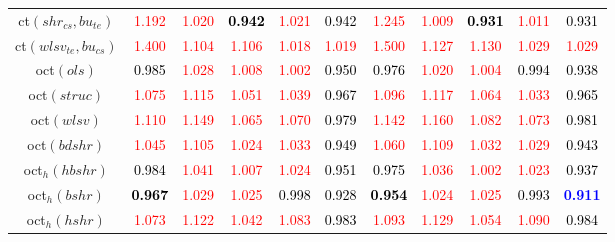 \begin{tabular}[t]{c|>{}cccc>{}c|ccccc}
ct$(shr_{cs}, bu_{te})$ & \textcolor{red}{1.192} & \textcolor{red}{1.020} & \textcolor{black}{\textbf{0.942}} & \textcolor{red}{1.021} & \textcolor{black}{0.942} & \textcolor{red}{1.245} & \textcolor{red}{1.009} & \textcolor{black}{\textbf{0.931}} & \textcolor{red}{1.011} & \textcolor{black}{0.931}\\
ct$(wlsv_{te}, bu_{cs})$ & \textcolor{red}{1.400} & \textcolor{red}{1.104} & \textcolor{red}{1.106} & \textcolor{red}{1.018} & \textcolor{red}{1.019} & \textcolor{red}{1.500} & \textcolor{red}{1.127} & \textcolor{red}{1.130} & \textcolor{red}{1.029} & \textcolor{red}{1.029}\\
oct$(ols)$ & \textcolor{black}{0.985} & \textcolor{red}{1.028} & \textcolor{red}{1.008} & \textcolor{red}{1.002} & \textcolor{black}{0.950} & \textcolor{black}{0.976} & \textcolor{red}{1.020} & \textcolor{red}{1.004} & \textcolor{black}{0.994} & \textcolor{black}{0.938}\\
oct$(struc)$ & \textcolor{red}{1.075} & \textcolor{red}{1.115} & \textcolor{red}{1.051} & \textcolor{red}{1.039} & \textcolor{black}{0.967} & \textcolor{red}{1.096} & \textcolor{red}{1.117} & \textcolor{red}{1.064} & \textcolor{red}{1.033} & \textcolor{black}{0.965}\\
oct$(wlsv)$ & \textcolor{red}{1.110} & \textcolor{red}{1.149} & \textcolor{red}{1.065} & \textcolor{red}{1.070} & \textcolor{black}{0.979} & \textcolor{red}{1.142} & \textcolor{red}{1.160} & \textcolor{red}{1.082} & \textcolor{red}{1.073} & \textcolor{black}{0.981}\\
oct$(bdshr)$ & \textcolor{red}{1.045} & \textcolor{red}{1.105} & \textcolor{red}{1.024} & \textcolor{red}{1.033} & \textcolor{black}{0.949} & \textcolor{red}{1.060} & \textcolor{red}{1.109} & \textcolor{red}{1.032} & \textcolor{red}{1.029} & \textcolor{black}{0.943}\\
oct$_h(hbshr)$ & \textcolor{black}{0.984} & \textcolor{red}{1.041} & \textcolor{red}{1.007} & \textcolor{red}{1.024} & \textcolor{black}{0.951} & \textcolor{black}{0.975} & \textcolor{red}{1.036} & \textcolor{red}{1.002} & \textcolor{red}{1.023} & \textcolor{black}{0.937}\\
oct$_h(bshr)$ & \textcolor{black}{\textbf{0.967}} & \textcolor{red}{1.029} & \textcolor{red}{1.025} & \textcolor{black}{0.998} & \textcolor{black}{0.928} & \textcolor{black}{\textbf{0.954}} & \textcolor{red}{1.024} & \textcolor{red}{1.025} & \textcolor{black}{0.993} & \textcolor{blue}{\textbf{0.911}}\\
oct$_h(hshr)$ & \textcolor{red}{1.073} & \textcolor{red}{1.122} & \textcolor{red}{1.042} & \textcolor{red}{1.083} & \textcolor{black}{0.983} & \textcolor{red}{1.093} & \textcolor{red}{1.129} & \textcolor{red}{1.054} & \textcolor{red}{1.090} & \textcolor{black}{0.984}\\

\end{tabular}
